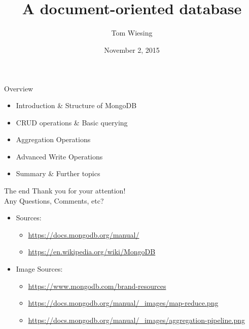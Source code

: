 \documentclass{beamer}
\title{\logoimage{imgs/logo}{40px}\\A document-oriented database}
\author{Tom Wiesing}
\institute{Databases \& Web Applications}
\date{November 2, 2015}
\begin{document}
    \frame{\titlepage}

    \begin{frame}{Overview}
      \begin{itemize}
          \item Introduction \& Structure of MongoDB
          \item CRUD operations \& Basic querying
          \item Aggregation Operations
          \item Advanced Write Operations
          \item Summary \& Further topics
      \end{itemize}
    \end{frame}

    

    

    

    

    

    \begin{frame}{The end}
      {\huge
        Thank you for your attention!\\
        Any Questions, Comments, etc?
      }

      \begin{itemize}
        \item Sources:
        \begin{itemize}
          \item \url{https://docs.mongodb.org/manual/}
          \item \url{https://en.wikipedia.org/wiki/MongoDB}
        \end{itemize}
        \item Image Sources:
        \begin{itemize}
          \item \url{https://www.mongodb.com/brand-resources}
          \item \url{https://docs.mongodb.org/manual/_images/map-reduce.png}
          \item \url{https://docs.mongodb.org/manual/_images/aggregation-pipeline.png}
        \end{itemize}
      \end{itemize}
    \end{frame}
\end{document}
